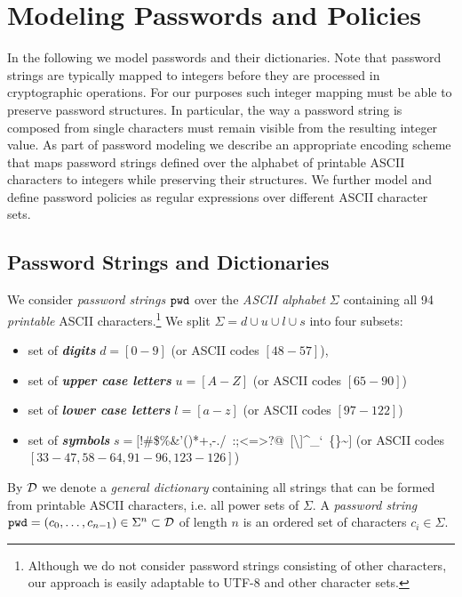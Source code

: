 \section{Modeling Passwords and Policies} \label{sec:passwords}
In the following we model passwords and their dictionaries. Note that password strings are typically mapped to integers before they are processed in cryptographic operations. For our purposes such integer mapping must be able to preserve password structures. In particular, the way a password string is composed from single characters must remain visible from the resulting integer value. As part of password modeling we describe an appropriate encoding scheme that maps password strings defined over the alphabet of printable ASCII characters to integers while preserving their structures. We further model and define password policies as regular expressions over different ASCII character sets.

\subsection{Password Strings and Dictionaries}
We consider \emph{password strings} $\mathtt{pwd}$ over the \emph{ASCII alphabet} $\Sigma$ containing all 94 \emph{printable} ASCII characters.\footnote{Although we do not consider password strings consisting of other characters, our approach is easily adaptable to UTF-8 and other character sets.} We split $\Sigma=d\cup u\cup l\cup s$ into four subsets:
\begin{itemize}
	\item set of \emph{\bf digits} $d=[0-9]$ (or ASCII codes $[48-57]$),
	\item set of \emph{\bf upper case letters} $u=[A-Z]$ (or ASCII codes $[65-90]$)
	\item set of \emph{\bf lower case letters} $l=[a-z]$ (or ASCII codes $[97-122]$)
	\item set of \emph{\bf symbols} $s=[$!\textquotedbl\#\$\%\&'()*+,-./~:;\textless=\textgreater?@~[\textbackslash]\^{}\_`~\{\textbar\}\textasciitilde$]$ (or ASCII codes $[33-47,58-64,91-96,123-126]$)
\end{itemize}

\noindent
By $\mathcal{D}$ we denote a \emph{general dictionary} containing all strings that can be formed from printable ASCII characters, i.e. all power sets of $\Sigma$.
A \emph{password string} $\mathtt{pwd}=(c_{0},\dots,c_{n-1})\in\Sigma^n\subset\mathcal{D}$ of length $n$ is an ordered set of characters $c_i\in\Sigma$.

